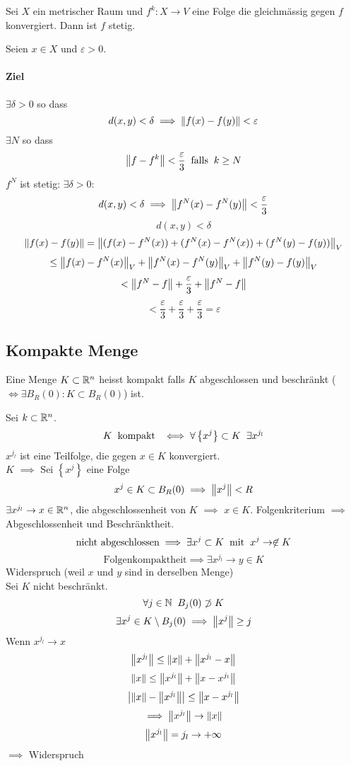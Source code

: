 \begin{Sat}
  Sei $X$ ein metrischer Raum und $f^k:X\to V$ eine Folge die gleichmässig gegen $f$ konvergiert. Dann ist $f$ stetig.
\end{Sat}
\begin{Bew}
  Seien $x\in X$ und $\varepsilon>0$.
  \paragraph{Ziel} $\exists \delta>0$ so dass
  \[d(x,y)<\delta\implies\left\| f(x)-f(y) \right\|<\varepsilon\]
  $\exists N$ so dass
  \[\left\| f-f^k \right\|<\frac{\varepsilon}{3}\hspace{2mm}\text{falls}\hspace{2mm} k\geq N\]
  $f^N$ ist stetig: $\exists \delta>0$:
  \[d(x,y)<\delta\implies \left\| f^N(x)-f^N(y) \right\|<\frac{\varepsilon}{3}\]
  \[d(x,y)<\delta\]
  \[\left\| f(x)-f(y) \right\|=\left\| (f(x)-f^N(x))+(f^N(x)-f^N(x))+(f^N(y)-f(y)) \right\|_V\]
  \[\leq\left\| f(x)-f^N(x) \right\|_V+\left\| f^N(x)-f^N(y) \right\|_V+\left\| f^N(y)-f(y) \right\|_V\]
  \[<\left\| f^N-f \right\|+\frac{\varepsilon}{3}+\left\| f^N-f \right\|\]
  \[<\frac{\varepsilon}{3}+\frac{\varepsilon}{3}+\frac{\varepsilon}{3}=\varepsilon\]
\end{Bew}
\subsection{Kompakte Menge}
\begin{Def}
  Eine Menge $K\subset \mathbb{R}^n$ heisst kompakt falls $K$ abgeschlossen und beschränkt ($\iff \exists B_R(0):K\subset B_R(0)$) ist.
\end{Def}
\begin{Sat}
  Sei $k\subset\mathbb{R}^n$.
  \[K \hspace{2mm}\text{kompakt}\hspace{2mm} \iff\forall \left\{ x^j \right\}\subset K\hspace{2mm}\exists x^{j_l}\]
  $x^{j_l}$ ist eine Teilfolge, die gegen $x\in K$ konvergiert.\\
  $K$ $\implies$ Sei $\left\{ x^j \right\}$ eine Folge
  \[x^j\in K\subset B_R(0)\implies \left\| x^j \right\|<R\]
  $\exists x^{j_l}\rightarrow x\in\mathbb{R}^n$, die abgeschlossenheit von $K$ $\implies$ $x\in K$. Folgenkriterium $\implies$ Abgeschlossenheit und Beschränktheit.
  \[\text{nicht abgeschlossen}\implies \exists x^j\subset K\hspace{2mm}\text{mit}\hspace{2mm} x^j\rightarrow\not\in K\]
  \[\text{Folgenkompaktheit}\implies \exists x^{j_l}\to y\in K\]
  Widerspruch (weil $x$ und $y$ sind in derselben Menge)\\
  Sei $K$ nicht beschränkt.
  \[\forall j\in\mathbb{N}\hspace{2mm} B_j(0)\not\supset K\]
  \[\exists x^j\in K\setminus B_j(0)\implies \left\| x^j \right\|\geq j\]
  Wenn $x^{j_l}\to x$
  \[\left\| x^{j_l} \right\|\leq \left\| x \right\|+\left\| x^{j_l}-x \right\|\]
  \[\left\| x \right\|\leq\left\| x^{j_l} \right\|+\left\| x-x^{j_l} \right\|\]
  \[\left| \left\| x \right\|-\left\| x^{j_l} \right\| \right|\leq\left\| x-x^{j_l} \right\|\]
  \[\implies\left\| x^{j_l} \right\|\rightarrow\left\| x \right\|\]
  \[\left\| x^{j_l} \right\|=j_l\rightarrow+\infty\]
  $\implies$ Widerspruch
\end{Sat}
